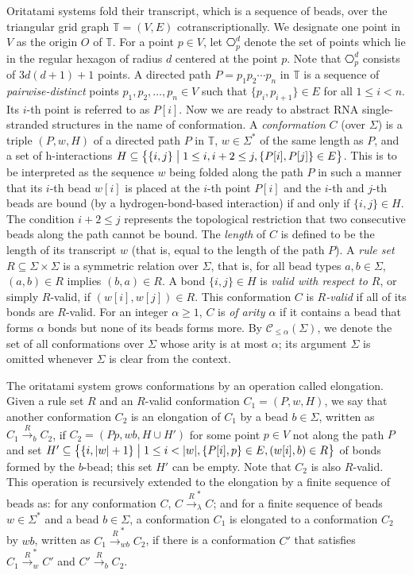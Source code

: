 \documentclass[runningheads]{llncs}
\begin{document}
Oritatami systems fold their transcript, which is a sequence of beads, over the triangular grid graph $\mathbb{T} = (V, E)$ cotranscriptionally. 
We designate one point in $V$ as the origin $O$ of $\mathbb{T}$. 
For a point $p \in V$, let $\hexagon_p^d$ denote the set of points which lie in the regular hexagon of radius $d$ centered at the point $p$. 
Note that $\hexagon_p^d$ consists of $3d(d+1)+1$ points. 
A directed path $P = p_1 p_2 \cdots p_n$ in $\mathbb{T}$ is a sequence of \textit{pairwise-distinct} points $p_1, p_2, \ldots, p_n \in V$ such that $\{p_i, p_{i+1}\} \in E$ for all $1 \le i < n$. 
Its $i$-th point is referred to as $P[i]$. 
Now we are ready to abstract RNA single-stranded structures in the name of conformation. 
A \textit{conformation} $C$ (over $\Sigma$) is a triple $(P, w, H)$ of a directed path $P$ in $\mathbb{T}$, $w \in \Sigma^*$ of the same length as $P$, and a set of h-interactions $H \subseteq \bigl\{\{i, j\} \bigm| 1 \le i, i+2 \le j, \{P[i], P[j]\} \in E \bigr\}$. 
This is to be interpreted as the sequence $w$ being folded along the path $P$ in such a manner that its $i$-th bead $w[i]$ is placed at the $i$-th point $P[i]$ and the $i$-th and $j$-th beads are bound (by a hydrogen-bond-based interaction) if and only if $\{i, j\} \in H$. 
The condition $i+2 \le j$ represents the topological restriction that two consecutive beads along the path cannot be bound. 
The \textit{length} of $C$ is defined to be the length of its transcript $w$ (that is, equal to the length of the path $P$). 
A \textit{rule set} $R \subseteq \Sigma \times \Sigma$ is a symmetric relation over $\Sigma$, that is, for all bead types $a, b \in \Sigma$, $(a, b) \in R$ implies $(b, a) \in R$. 
A bond $\{i, j\} \in H$ is \textit{valid with respect to $R$}, or simply $R$-valid, if $(w[i], w[j]) \in R$. 
This conformation $C$ is \textit{$R$-valid} if all of its bonds are $R$-valid. 
For an integer $\alpha \ge 1$, $C$ is \textit{of arity $\alpha$} if it contains a bead that forms $\alpha$ bonds but none of its beads forms more. 
By $\mathcal{C}_{\le \alpha}(\Sigma)$, we denote the set of all conformations over $\Sigma$ whose arity is at most $\alpha$; its argument $\Sigma$ is omitted whenever $\Sigma$ is clear from the context. 

The oritatami system grows conformations by an operation called elongation. 
Given a rule set $R$ and an $R$-valid conformation $C_1 = (P, w, H)$, we say that another conformation $C_2$ is an elongation of $C_1$ by a bead $b \in \Sigma$, written as $C_1 \xrightarrow{R}_b C_2$, if $C_2 = (P p, wb, H \cup H')$ for some point $p \in V$ not along the path $P$ and set $H' \subseteq \bigl\{ \{i, |w|+1\} \bigm| 1 \le i < |w|, \{P[i], p\} \in E, (w[i], b) \in R \bigr\}$ of bonds formed by the $b$-bead; this set $H'$ can be empty. 
Note that $C_2$ is also $R$-valid. 
This operation is recursively extended to the elongation by a finite sequence of beads as: for any conformation $C$, $C \xrightarrow{R}_\lambda^* C$; and for a finite sequence of beads $w \in \Sigma^*$ and a bead $b \in \Sigma$, a conformation $C_1$ is elongated to a conformation $C_2$ by $wb$, written as $C_1 \xrightarrow{R}_{wb}^* C_2$, if there is a conformation $C'$ that satisfies $C_1 \xrightarrow{R}_w^* C'$ and $C' \xrightarrow{R}_b C_2$. 
\end{document}
